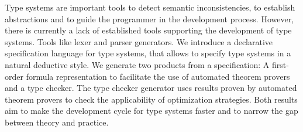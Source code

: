 Type systems are important tools to detect semantic inconsistencies,
to establish abstractions and to guide the programmer in the
development process. However, there is currently a lack of established
tools supporting the development of type systems. Tools like lexer and
parser generators. We introduce a declarative specification language
for type systems, that allows to specify type systems in a natural
deductive style. We generate two products from a specification: A
first-order formula representation to facilitate the use of automated
theorem provers and a type checker. The type checker generator uses
results proven by automated theorem provers to check the applicability
of optimization strategies. Both results aim to make the development
cycle for type systems faster and to narrow the gap between theory and
practice.

